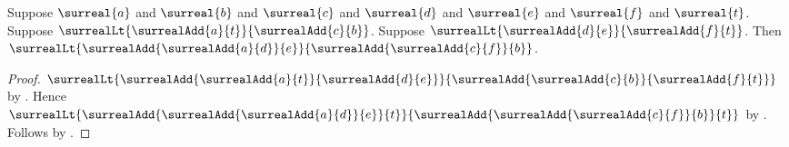 \begin{lemma}\label{surreal_add_three_balance}
    Suppose $\surreal{a}$ and $\surreal{b}$ and $\surreal{c}$ and
        $\surreal{d}$ and $\surreal{e}$ and $\surreal{f}$ and
        $\surreal{t}$.
    Suppose $\surrealLt{\surrealAdd{a}{t}}{\surrealAdd{c}{b}}$.
    Suppose $\surrealLt{\surrealAdd{d}{e}}{\surrealAdd{f}{t}}$.
    Then $\surrealLt
        {\surrealAdd{\surrealAdd{a}{d}}{e}}
        {\surrealAdd{\surrealAdd{c}{f}}{b}}$.
\end{lemma}
\begin{proof}
    $\surrealLt
        {\surrealAdd{\surrealAdd{a}{t}}{\surrealAdd{d}{e}}}
        {\surrealAdd{\surrealAdd{c}{b}}{\surrealAdd{f}{t}}}$
        by .
    Hence $\surrealLt
        {\surrealAdd{\surrealAdd{\surrealAdd{a}{d}}{e}}{t}}
        {\surrealAdd{\surrealAdd{\surrealAdd{c}{f}}{b}}{t}}$
        by
        .
    Follows by .
\end{proof}
